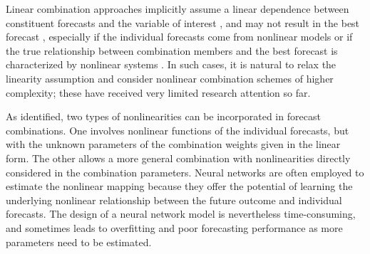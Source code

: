 \documentclass[a4paper,11pt]{article}
\begin{document}
Linear combination approaches implicitly assume a linear dependence between constituent forecasts and the variable of interest \citep{Donaldson1996-um,Freitas2006-fn}, and may not result in the best forecast \citep{Ming_Shi1999-vs}, especially if the individual forecasts come from nonlinear models or if the true relationship between combination members and the best forecast is characterized by nonlinear systems \citep{Babikir2016-xz}. In such cases, it is natural to relax the linearity assumption and consider nonlinear combination schemes of higher complexity; these have received very limited research attention so far.

As \citet{Timmermann2006-en} identified, two types of nonlinearities can be incorporated in forecast combinations. One involves nonlinear functions of the individual forecasts, but with the unknown parameters of the combination weights given in the linear form. The other allows a more general combination with nonlinearities directly considered in the combination parameters. Neural networks are often employed to estimate the nonlinear mapping because they offer the potential of learning the underlying nonlinear relationship between the future outcome and individual forecasts. The design of a neural network model is nevertheless time-consuming, and sometimes leads to overfitting and poor forecasting performance as more parameters need to be estimated.
\end{document}
